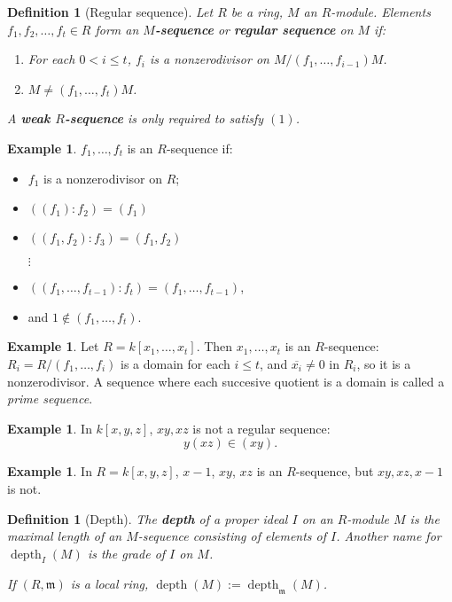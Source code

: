 \documentclass[11pt]{book}
\newtheorem{definition}[theorem]{Definition}
\numberwithin{equation}{section}
\numberwithin{theorem}{chapter}
\theoremstyle{definition}
\newtheorem{example}[theorem]{Example}
\newtheorem*{basic properties}{Basic Properties}
\newtheorem*{Important Remark}{Important Remark}
\theoremstyle{remark}
\newcommand{\m}{\mathfrak{m}}
\newcommand{\depth}{\operatorname{depth}}
\begin{document}
\begin{definition}[Regular sequence]
	Let $R$ be a ring, $M$ an $R$-module. Elements $f_1, f_2, \ldots, f_t \in R$ form an {\bf $M$-sequence} or {\bf regular sequence} on $M$ if:
	\begin{enumerate}[(1)]
		\item For each $0 < i \leqslant t$, $f_i$ is a nonzerodivisor on $M/(f_1, \ldots, f_{i-1})M$.
		\item $M \neq (f_1, \ldots, f_t)M$.
	\end{enumerate}
	A {\bf weak $R$-sequence} is only required to satisfy $(1)$.
\end{definition}

\begin{example}
	$f_1, \ldots, f_t$ is an $R$-sequence if:
	\begin{itemize}
		\item $f_1$ is a nonzerodivisor on $R$;
		\item $((f_1) : f_2) = (f_1)$
		\item $((f_1,f_2) : f_3) = (f_1,f_2)$
		
		\qquad\qquad $\vdots$
		\item $((f_1,\ldots, f_{t-1}) : f_t) = (f_1,\ldots, f_{t-1})$,
		\item and $1\notin (f_1,\dots,f_t)$.

	\end{itemize}
\end{example}


\begin{example}
	Let $R = k[x_1, \ldots, x_t]$. Then $x_1, \ldots, x_t$ is an $R$-sequence: $R_i = R / (f_1,\ldots, f_i)$ is a domain for each $i \leqslant t$, and $\overline{x_i} \neq 0$ in $R_i$, so it is a nonzerodivisor. A sequence where each succesive quotient is a domain is called a \emph{prime sequence}.
\end{example}


\begin{example}
	In $k[x,y,z]$, $xy,xz$ is not a regular sequence:
$$y(xz) \in (xy).$$
\end{example}


\begin{example}
In $R = k[x,y,z]$, $x-1$, $xy$, $xz$ is an $R$-sequence, but $xy,xz,x-1$ is not.	
\end{example}



\begin{definition}[Depth]\index{$\depth_I(M)$}\index{$\depth(M)$}
The	{\bf depth} of a proper ideal $I$ on an $R$-module $M$ is the maximal length of an $M$-sequence consisting of elements of $I$. Another name for $\depth_I(M)$ is the \emph{grade} of $I$ on $M$.

If $(R,\m)$ is a local ring, $\depth(M) := \depth_\m (M)$.
\end{definition}
\end{document}
